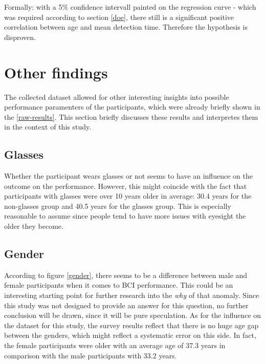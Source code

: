             \medskip

            Formally: with a 5\% confidence intervall painted on the regression curve - which was required according to section \ref*{doe}, there still is a significant positive correlation between age and mean detection time. Therefore the hypothesis is disproven.

        \section{Other findings}\label{other-findings}

            The collected dataset allowed for other interesting insights into possible performance paramenters of the participants, which were already briefly shown in the \ref*{raw-results}. This section briefly discusses these results and interpretes them in the context of this study.

            \subsection{Glasses}

                Whether the participant wears glasses or not seems to have an influence on the outcome on the performance. However, this might coincide with the fact that participants with glasses were over 10 years older in average: 30.4 years for the non-glasses group and 40.5 years for the glasses group. This is especially reasonable to assume since people tend to have more issues with eyesight the older they become.  

            \subsection{Gender}

                According to figure \ref*{gender}, there seems to be a difference between male and female participants when it comes to BCI performance. This could be an interesting starting point for further research into the \textit{why} of that anomaly. Since this study was not designed to provide an answer for this question, no further conclusion will be drawn, since it will be pure speculation. As for the influence on the dataset for this study, the survey results reflect that there is no huge age gap between the genders, which might reflect a systematic error on this side. In fact, the female participants were older with an average age of 37.3 years in comparison with the male participants with 33.2 years.


